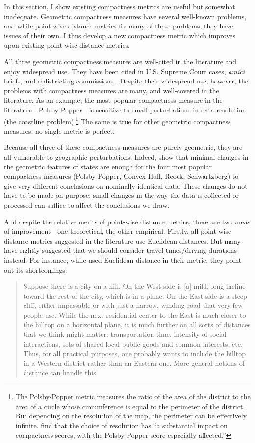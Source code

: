 \documentclass[]{article}
\begin{document}
In this section, I show existing compactness metrics are useful but
somewhat inadequate. Geometric compactness measures have several
well-known problems, and while point-wise distance metrics fix many of
these problems, they have issues of their own. I thus develop a new
compactness metric which improves upon existing point-wise distance
metrics.

All three geometric compactness measures are well-cited in the
literature and enjoy widespread use. They have been cited in U.S.
Supreme Court cases, \emph{amici} briefs, and redistricting commissions
\citep{moncrief2011}. Despite their widespread use, however, the
problems with compactness measures are many, and well-covered in the
literature. As an example, the most popular compactness measure in the
literature---Polsby-Popper---is sensitive to small perturbations in data
resolution (the coastline problem).\footnote{The Polsby-Popper metric
  measures the ratio of the area of the district to the area of a circle
  whose circumference is equal to the perimeter of the district. But
  depending on the resolution of the map, the perimeter can be
  effectively infinite. \citeauthor{bswp} find that the choice of
  resolution has ``a substantial impact on compactness scores, with the
  Polsby-Popper score especially affected.''} The same is true for other
geometric compactness measures: no single metric is perfect.

Because all three of these compactness measures are purely geometric,
they are all vulnerable to geographic perturbations. Indeed, \cite{bswp}
show that minimal changes in the geometric features of states are enough
for the four most popular compactness measures (Polsby-Popper, Convex
Hull, Reock, Schwartzberg) to give very different conclusions on
nominally identical data. These changes do not have to be made on
purpose: small changes in the way the data is collected or processed can
suffice to affect the conclusions we draw.

And despite the relative merits of point-wise distance metrics, there
are two areas of improvement---one theoretical, the other empirical.
Firstly, all point-wise distance metrics suggested in the literature use
Euclidean distances. But many have rightly suggested that we should
consider travel times/driving durations instead. For instance, while
\cite{fh2011} used Euclidean distance in their metric, they point out
its shortcomings:

\begin{quote}
Suppose there is a city on a hill. On the West side is {[}a{]} mild,
long incline toward the rest of the city, which is in a plane. On the
East side is a steep cliff, either impassable or with just a narrow,
winding road that very few people use. While the next residential center
to the East is much closer to the hilltop on a horizontal plane, it is
much further on all sorts of distances that we think might matter:
transportation time, intensity of social interactions, sets of shared
local public goods and common interests, etc. Thus, for all practical
purposes, one probably wants to include the hilltop in a Western
district rather than an Eastern one. More general notions of distance
can handle this.
\end{quote}
\end{document}
